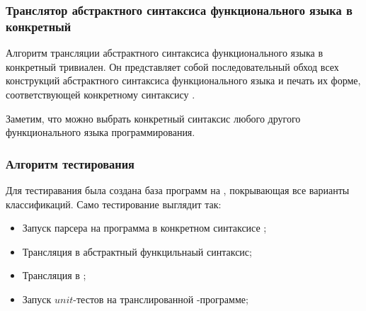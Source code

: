 
\subsubsection{Транслятор абстрактного синтаксиса функционального языка в конкретный}

Алгоритм трансляции абстрактного синтаксиса функционального языка в конкретный тривиален.
Он представляет собой последовательный обход всех конструкций абстрактного синтаксиса функционального языка и печать их форме, соответствующей конкретному синтаксису \haskell{}.

Заметим, что можно выбрать конкретный синтаксис любого другого функционального языка программирования.


\subsubsection{Алгоритм тестирования}

Для тестиравания была создана база программ на \miniKanren{}, покрывающая все варианты классификаций.
Само тестирование выглядит так:
\begin{itemize}
    \item Запуск парсера на программа в конкретном синтаксисе \miniKanren{};
    \item Трансляция в абстрактный функцильнаый синтаксис;
    \item Трансляция в \haskell{};
    \item Запуск $unit$-тестов на транслированной \haskell{}-программе;
\end{itemize}